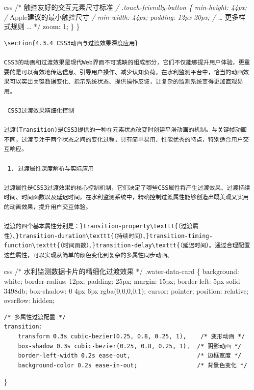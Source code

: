 css /* 触控友好的交互元素尺寸标准 \emph{/ .touch-friendly-button \{ min-height: 44px; /} Apple建议的最小触控尺寸 \emph{/ min-width: 44px; padding: 12px 20px; /} \ldots{} 更多样式规则 \ldots{} */ zoom: 1; \} \}

\begin{lstlisting}
\section{4.3.4 CSS3动画与过渡效果深度应用}

CSS3的动画和过渡效果是现代Web界面不可或缺的组成部分，它们不仅能够提升用户体验，更重要的是可以有效地传达信息、引导用户操作、减少认知负荷。在水利监测平台中，恰当的动画效果可以突出关键数据变化、指示系统状态、提供操作反馈，让复杂的监测系统变得更加直观易用。

 CSS3过渡效果精细化控制

过渡(Transition)是CSS3提供的一种在元素状态改变时创建平滑动画的机制。与关键帧动画不同，过渡专注于两个状态之间的变化过程，具有简单易用、性能优秀的特点，特别适合用户交互响应。

 1. 过渡属性深度解析与实际应用

过渡属性是CSS3过渡效果的核心控制机制，它们决定了哪些CSS属性将产生过渡效果、过渡持续时间、时间函数以及延迟时间。在水利监测系统中，精确控制过渡属性能够创造出既美观又实用的动画效果，提升用户交互体验。

过渡的四个基本属性分别是：}transition-property\texttt{（过渡属性）、}transition-duration\texttt{（持续时间）、}transition-timing-function\texttt{（时间函数）、}transition-delay\texttt{（延迟时间）。通过合理配置这些属性，可以实现从简单的颜色变化到复杂的多属性同步动画。
\end{lstlisting}

css /* 水利监测数据卡片的精细化过渡效果 */ .water-data-card \{ background: white; border-radius: 12px; padding: 25px; margin: 15px; border-left: 5px solid 3498db; box-shadow: 0 4px 6px rgba(0,0,0,0.1); cursor: pointer; position: relative; overflow: hidden;

\begin{verbatim}
/* 多属性过渡配置 */
transition: 
    transform 0.3s cubic-bezier(0.25, 0.8, 0.25, 1),    /* 变形动画 */
    box-shadow 0.3s cubic-bezier(0.25, 0.8, 0.25, 1),  /* 阴影动画 */
    border-left-width 0.2s ease-out,                   /* 边框宽度 */
    background-color 0.2s ease-in-out;                 /* 背景色变化 */
\end{verbatim}

\}

